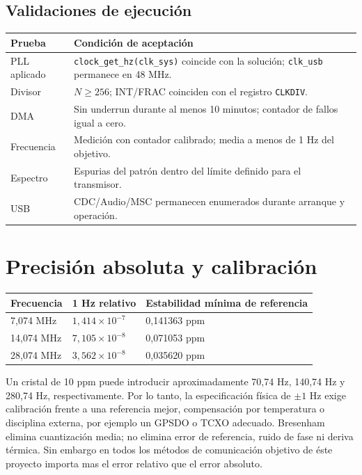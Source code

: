\documentclass[10pt,a4paper]{article}
\begin{document}
\subsection{Validaciones de ejecución}
\begin{tabularx}{\textwidth}{p{}Y}
\toprule
{}
\color{white}Prueba & \color{white}Condición de aceptación\\
\midrule
PLL aplicado & \texttt{clock\_get\_hz(clk\_sys)} coincide con la solución;
\texttt{clk\_usb} permanece en 48 MHz.\\
Divisor & \(N\geq256\); INT/FRAC coinciden con el registro \texttt{CLKDIV}.\\
DMA & Sin underrun durante al menos 10 minutos; contador de fallos igual a cero.\\
Frecuencia & Medición con contador calibrado; media a menos de 1 Hz del objetivo.\\
Espectro & Espurias del patrón dentro del límite definido para el transmisor.\\
USB & CDC/Audio/MSC permanecen enumerados durante arranque y operación.\\
\bottomrule
\end{tabularx}

\clearpage
\section{Precisión absoluta y calibración}
\begin{tabularx}{0.78\textwidth}{p{}p{}Y}
\toprule
{}
\color{white}Frecuencia & \color{white}1 Hz relativo &
\color{white}Estabilidad mínima de referencia\\
,074 MHz & \(1{,}414\times10^{-7}\) & 0,141363 ppm\\
14,074 MHz & \(7{,}105\times10^{-8}\) & 0,071053 ppm\\
28,074 MHz & \(3{,}562\times10^{-8}\) & 0,035620 ppm\\
\bottomrule
\end{tabularx}

Un cristal de 10 ppm puede introducir aproximadamente 70,74 Hz, 140,74 Hz y
280,74 Hz, respectivamente. Por lo tanto, la especificación física de
\(\pm1\) Hz exige calibración frente a una referencia mejor, compensación por
temperatura o disciplina externa, por ejemplo un GPSDO o TCXO adecuado.
Bresenham elimina cuantización media; no elimina error de referencia, ruido
de fase ni deriva térmica.
Sin embargo en todos los métodos de comunicación objetivo de éste proyecto
importa mas el error relativo que el error absoluto.
\end{document}
